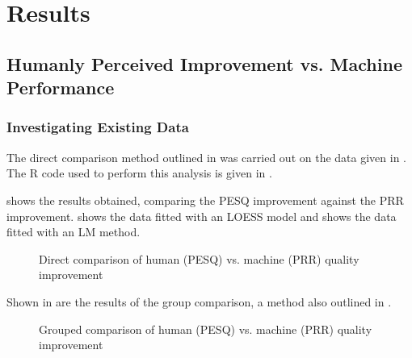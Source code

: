 
\chapter{Results}

\acresetall


\section{Humanly Perceived Improvement vs. Machine Performance}


\subsection{Investigating Existing Data}

The direct comparison method outlined in 
was carried out on the data given in  \textit{}.
The R code used to perform this analysis is given in .

 shows the results obtained, comparing the
\ac{PESQ} improvement against the \ac{PRR} improvement. 
shows the data fitted with an \ac{LOESS} model and 
shows the data fitted with an \ac{LM} method.

\begin{figure}[p]

\protect\caption{\label{fig:Direct-PESQ-PRR}Direct comparison of human (\acs{PESQ})
vs. machine (\acs{PRR}) quality improvement}
\end{figure}


Shown in  are the results of the group comparison,
a method also outlined in .

\begin{figure}[p]

\protect\caption{\label{fig:Group-PESQ-PRR}Grouped comparison of human (\acs{PESQ})
vs. machine (\acs{PRR}) quality improvement}
\end{figure}


